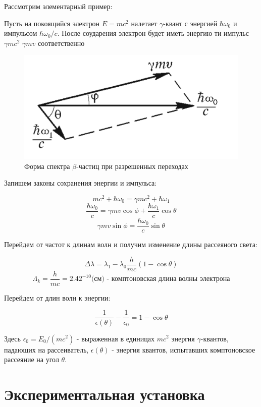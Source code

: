 \documentclass[a4paper]{article}
\begin{document}
Рассмотрим элементарный пример:

Пусть на покоящийся электрон $E = mc^2$ налетает $\gamma$-квант с энергией $\hbar \omega_0$ и импульсом
$\hbar \omega_0/c$. После соударения электрон будет иметь энергию ти импульс $\gamma mc^2$   $\gamma m v$ 
соответственно

\begin{figure}
    \includegraphics[scale = 0.2]{p1.png}
    \caption{Форма спектра $\beta$-частиц при разрешенных переходах}
    \label{p1}
\end{figure}

Запишем законы сохранения энергии и импульса:

$$mc^2 + \hbar\omega_0 = \gamma mc^2 + \hbar \omega_1$$
$$\frac{\hbar \omega_0}{c} = \gamma mv\cos{\phi} + \frac{\hbar \omega_1}{c}\cos{\theta}$$
$$\gamma mv\sin{\phi} = \frac{\hbar \omega_0}{c}\sin{\theta}$$

Перейдем от частот к длинам волн и получим изменение длины рассеяного света:

$$\Delta \lambda = \lambda_1 - \lambda_0 \frac{h}{mc} (1 - \cos{\theta})$$
$$\Lambda_k = \frac{h}{mc} = 2.42^{-10} \text{(см) - комптоновская длина волны электрона}$$

Перейдем от длин волн к энергии:

$$\frac{1}{\epsilon(\theta)} - \frac{1}{\epsilon_0} = 1 - \cos{\theta}$$

Здесь $\epsilon_0 = E_0 / (mc^2)$ - выраженная в единицах $mc^2$ энергия $\gamma$-квантов, 
падающих на рассеиватель, $\epsilon(\theta)$ - энергия квантов, испытавших комптоновское рассеяние на угол $\theta$.

\section{Экспериментальная установка}
\end{document}
